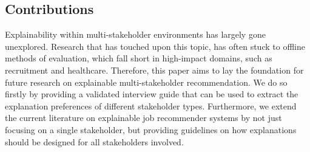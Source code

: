 \subsection{Contributions}
Explainability within multi-stakeholder environments has largely gone unexplored. Research that has touched upon this topic, has often stuck to offline methods of evaluation, which fall short in high-impact domains, such as recruitment and healthcare. Therefore, this paper aims to lay the foundation for future research on explainable multi-stakeholder recommendation. We do so firstly by providing a validated interview guide that can be used to extract the explanation preferences of different stakeholder types. Furthermore, we extend the current literature on explainable job recommender systems by not just focusing on a single stakeholder, but providing guidelines on how explanations should be designed for all stakeholders involved. 